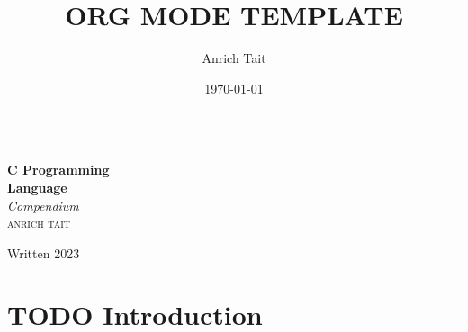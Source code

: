 \documentclass[a4paper]{article}
\author{Anrich Tait}
\date{\today}
\title{ORG MODE TEMPLATE}
\begin{document}

\newcommand*{\plogo}{\fbox{$\mathcal{PL}$}} %





\begin{titlepage} %
	
	\raggedleft %
	
	\rule{1pt}{\textheight} %
	\hspace{0.05\textwidth} %
	\parbox[b]{0.75\textwidth}{ %
		
		{\Huge\bfseries C Programming \\[0.5\baselineskip] Language}\\[2\baselineskip] %
		{\large\textit{Compendium }}\\[4\baselineskip] %
		{\Large\textsc{anrich tait}} %
		
		\vspace{0.5\textheight} %
		
		{\noindent Written 2023}\\[\baselineskip] %
	}


\end{titlepage}

\tableofcontents
\newpage

\section{{\bfseries\sffamily TODO} Introduction}
\label{sec:orgc1005f9}
\end{document}

